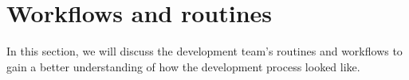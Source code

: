 \section{Workflows and routines}\label{sec:workflows-and-routines}

In this section, we will discuss the development team's routines and workflows to gain a better understanding of how
the development process looked like.
